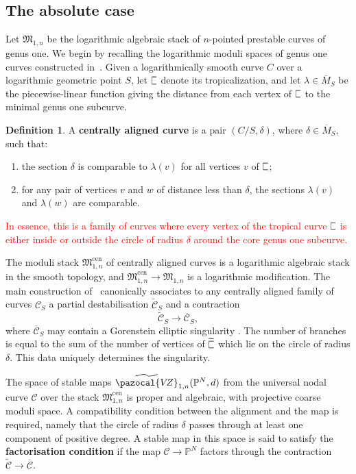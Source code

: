 \documentclass[11pt]{amsart}
\newcommand{\plC}{\scalebox{0.8}[1.3]{$\sqsubset$}}
\newcommand{\tred}{\textcolor{red}}
\newcommand{\sqC}{\scalebox{0.8}[1.3]{$\sqsubset$}}
\newcommand{\PP}{\mathbb P}
\newcommand{\VZ}{\pazocal{V\!Z}}
\renewcommand{\to}{\rightarrow}
\theoremstyle{definition}
\theoremstyle{definition}
\newtheorem{definition}[thm]{Definition}
\begin{document}
\subsection{The absolute case} Let $\mathfrak M_{1,n}$ be the logarithmic algebraic stack of $n$-pointed prestable curves of genus one. We begin by recalling the logarithmic moduli spaces of genus one curves constructed in~\cite[\S 2 \& \S 4]{RSPW}. Given a logarithmically smooth curve $C$ over a logarithmic geometric point $S$, let $\plC$ denote its tropicalization, and let $\lambda \in \overline{M}_{S}$ be the piecewise-linear function giving the distance from each vertex of $\sqC$ to the minimal genus one subcurve.
\begin{definition}
A \textbf{centrally aligned curve} is a pair $(C/S,\delta)$, where $\delta\in\overline{M}_S$, such that:
\begin{enumerate}
    \item the section $\delta$ is comparable to $\lambda(v)$ for all vertices $v$ of $\plC$;
    \item for any pair of vertices $v$ and $w$ of distance less than $\delta$, the sections $\lambda(v)$ and $\lambda(w)$ are comparable.
\end{enumerate}
\end{definition}

\tred{In essence, this is a family of curves where every vertex of the tropical curve $\plC$ is either inside or outside the circle of radius $\delta$ around the core genus one subcurve.}

The moduli stack $\mathfrak M_{1,n}^{\mathrm{cen}}$  of centrally aligned curves is a logarithmic algebraic stack in the smooth topology, and $\mathfrak M_{1,n}^{\mathrm{cen}}\to\mathfrak M_{1,n}$ is a logarithmic modification. The main construction of~\cite{RSPW} canonically associates to any centrally aligned family of curves $\mathcal C_S$ a partial destabilisation $\widetilde{\mathcal C}_S$ and a contraction
\[
\widetilde{\mathcal C}_S\to \overline{\mathcal C}_S,
\]
where $\overline{\mathcal C}_S$ may contain a Gorenstein elliptic singularity \cite{SMY1}. The number of branches is equal to the sum of the number of vertices of $\widetilde{\sqC}$ which lie on the circle of radius $\delta$. This data uniquely determines the singularity.

The space of stable maps $\widetilde\VZ_{1,n}(\PP^N,d)$ from the universal nodal curve $\mathcal C$ over the stack $\mathfrak M_{1,n}^{\mathrm{cen}}$ is proper and algebraic, with projective coarse moduli space. A compatibility condition between the alignment and the map is required, namely that the circle of radius $\delta$ passes through at least one component of positive degree. A stable map in this space is said to satisfy the \textbf{factorisation condition} if the map $\mathcal C\to \mathbb P^N$ factors through the contraction $\widetilde{\mathcal C}\to \overline{\mathcal C}$.
 
\end{document}

